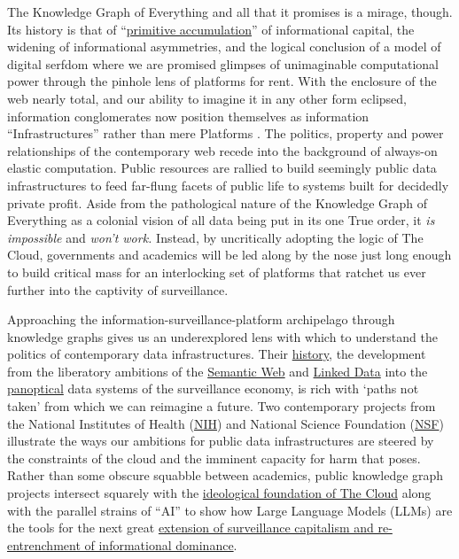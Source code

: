 \documentclass{article}
\begin{document}
The Knowledge Graph of Everything and all that it promises is a mirage,
though. Its history is that of
``\href{https://en.wikipedia.org/wiki/Primitive_accumulation_of_capital}{primitive
accumulation}'' of informational capital, the widening of informational
asymmetries, and the logical conclusion of a model of digital serfdom
where we are promised glimpses of unimaginable computational power
through the pinhole lens of platforms for rent. With the enclosure of
the web nearly total, and our ability to imagine it in any other form
eclipsed, information conglomerates now position themselves as
information ``Infrastructures'' rather than mere Platforms \cite{barnsWhenWebBecame2020, plantinInfrastructureStudiesMeet2018} . The
politics, property and power relationships of the contemporary web
recede into the background of always-on elastic computation. Public
resources are rallied to build seemingly public data infrastructures to
feed far-flung facets of public life to systems built for decidedly
private profit. Aside from the pathological nature of the Knowledge
Graph of Everything as a colonial vision of all data being put in its
one True order, it \emph{is impossible} and \emph{won't work.} Instead,
by uncritically adopting the logic of The Cloud, governments and
academics will be led along by the nose just long enough to build
critical mass for an interlocking set of platforms that ratchet us ever
further into the captivity of surveillance.

Approaching the information-surveillance-platform archipelago through
knowledge graphs gives us an underexplored lens with which to understand
the politics of contemporary data infrastructures. Their
\protect\hyperlink{knowledge-graphs-a-backbone-in-the-surveillance-economy}{history},
the development from the liberatory ambitions of the
\protect\hyperlink{semantic-web-priesthoods}{Semantic Web} and
\protect\hyperlink{linked-data-platforms}{Linked Data} into the
\protect\hyperlink{knowledge-graphs-panoptica}{panoptical} data systems
of the surveillance economy, is rich with `paths not taken' from which
we can reimagine a future. Two contemporary projects from the National
Institutes of Health
(\protect\hyperlink{nih-the-biomedical-translator}{NIH}) and National
Science Foundation (\protect\hyperlink{nsf-open-knowledge-network}{NSF})
illustrate the ways our ambitions for public data infrastructures are
steered by the constraints of the cloud and the imminent capacity for
harm that poses. Rather than some obscure squabble between academics,
public knowledge graph projects intersect squarely with the
\protect\hyperlink{the-cloud-orthodoxy}{ideological foundation of The
Cloud} along with the parallel strains of ``AI'' to show how Large
Language Models (LLMs) are the tools for the next great
\protect\hyperlink{the-near-future-of-surveillance-capitalism-knowledge-graphs-get-chatbots.}{extension
of surveillance capitalism and re-entrenchment of informational
dominance}.
\end{document}
